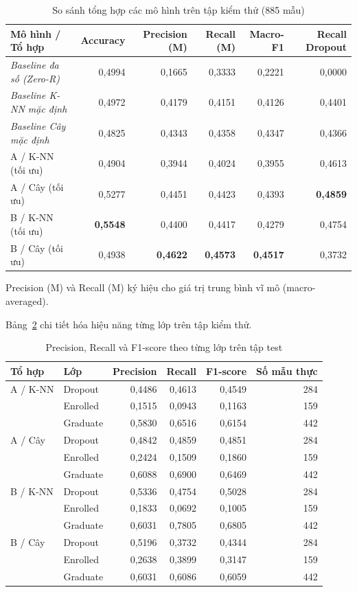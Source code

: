\begin{table}[H]\centering\small
\caption{So sánh tổng hợp các mô hình trên tập kiểm thử (885 mẫu)}\label{tab:test-summary}
\begin{tabular}{lrrrrr}\toprule
Mô hình / Tổ hợp & Accuracy & Precision (M) & Recall (M) & Macro-F1 & Recall Dropout\\\midrule
\emph{Baseline đa số (Zero-R)} & 0,4994 & 0,1665 & 0,3333 & 0,2221 & 0,0000\\
\emph{Baseline K-NN mặc định} & 0,4972 & 0,4179 & 0,4151 & 0,4126 & 0,4401\\
\emph{Baseline Cây mặc định} & 0,4825 & 0,4343 & 0,4358 & 0,4347 & 0,4366\\\midrule
A / K-NN (tối ưu) & 0,4904 & 0,3944 & 0,4024 & 0,3955 & 0,4613\\
A / Cây (tối ưu) & 0,5277 & 0,4451 & 0,4423 & 0,4393 & \textbf{0,4859}\\
B / K-NN (tối ưu) & \textbf{0,5548} & 0,4400 & 0,4417 & 0,4279 & 0,4754\\
B / Cây (tối ưu) & 0,4938 & \textbf{0,4622} & \textbf{0,4573} & \textbf{0,4517} & 0,3732\\
\bottomrule\end{tabular}
\par\smallskip\small Precision (M) và Recall (M) ký hiệu cho giá trị trung bình vĩ mô (macro-averaged).\normalsize
\end{table}

Bảng~\ref{tab:per-class} chi tiết hóa hiệu năng từng lớp trên tập kiểm thử.

\begin{table}[H]\centering\small
\caption{Precision, Recall và F1-score theo từng lớp trên tập test}\label{tab:per-class}
\begin{tabular}{llrrrr}\toprule
Tổ hợp & Lớp & Precision & Recall & F1-score & Số mẫu thực\\\midrule
A / K-NN & Dropout & 0,4486 & 0,4613 & 0,4549 & 284\\
 & Enrolled & 0,1515 & 0,0943 & 0,1163 & 159\\
 & Graduate & 0,5830 & 0,6516 & 0,6154 & 442\\\midrule
A / Cây & Dropout & 0,4842 & 0,4859 & 0,4851 & 284\\
 & Enrolled & 0,2424 & 0,1509 & 0,1860 & 159\\
 & Graduate & 0,6088 & 0,6900 & 0,6469 & 442\\\midrule
B / K-NN & Dropout & 0,5336 & 0,4754 & 0,5028 & 284\\
 & Enrolled & 0,1833 & 0,0692 & 0,1005 & 159\\
 & Graduate & 0,6031 & 0,7805 & 0,6805 & 442\\\midrule
B / Cây & Dropout & 0,5196 & 0,3732 & 0,4344 & 284\\
 & Enrolled & 0,2638 & 0,3899 & 0,3147 & 159\\
 & Graduate & 0,6031 & 0,6086 & 0,6059 & 442\\
\bottomrule\end{tabular}
\end{table}

